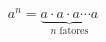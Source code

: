 \documentclass{article}
\begin{document}
$$a^n = \underbrace{a \cdot a \cdot a \cdots a}_{n\text{ fatores}}$$
\end{document}
